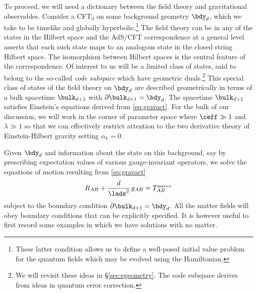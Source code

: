 \documentclass[12pt,openany]{book}
\begin{document}
To proceed, we will need a dictionary between the field theory and gravitational observables. Consider a CFT$_d$ on some background geometry $\bdy_d$, which we take to be timelike and globally hyperbolic.\footnote{ These latter condition allows us to define a well-posed initial value problem for the quantum fields which may be evolved using the Hamiltonian.}
The field theory can be in any of the states in the Hilbert space and the AdS/CFT correspondence at a general level asserts that each such state maps to an analogous state in the closed string Hilbert space. The isomorphism between Hilbert spaces is the central feature of the correspondence. Of interest to us will be a limited class of states, said to belong to the so-called {\em code subspace} which have geometric duals.\footnote{ We will revisit these ideas in \S\ref{sec:egeometry}. The code subspace derives from ideas in quantum error correction.}  This special class of states of the field theory on $\bdy_d$ are described geometrically in terms of a bulk spacetime $\bulk_{d+1}$ with $\partial\bulk_{d+1} = \bdy_d$. The spacetime
$\bulk_{d+1}$ satisfies Einstein's equations derived from \eqref{eq:gravact}. For the bulk of our discussion, we will work in the corner of parameter space where $\ceff \gg 1 $ and $\lambda \gg 1 $ so that we can effectively restrict attention to the two derivative theory of Einstein-Hilbert  gravity setting $\alpha_k = 0$.

Given $\bdy_d$ and information about the state on this background, say by prescribing expectation values of various gauge-invariant operators, we solve the equations of motion resulting from \eqref{eq:gravact}
%
\begin{equation}
R_{AB}  + \frac{d}{\lads^2}  \, g_{AB} = T_{AB}^\text{\tiny{matter}}
\label{eq:bulksaddle}
\end{equation}
%
subject to the boundary condition $\partial \bulk_{d+1} = \bdy_d$. All the matter fields will obey boundary conditions that can be explicitly specified. It is however useful to first record some examples in which we have solutions with no matter.
\end{document}
